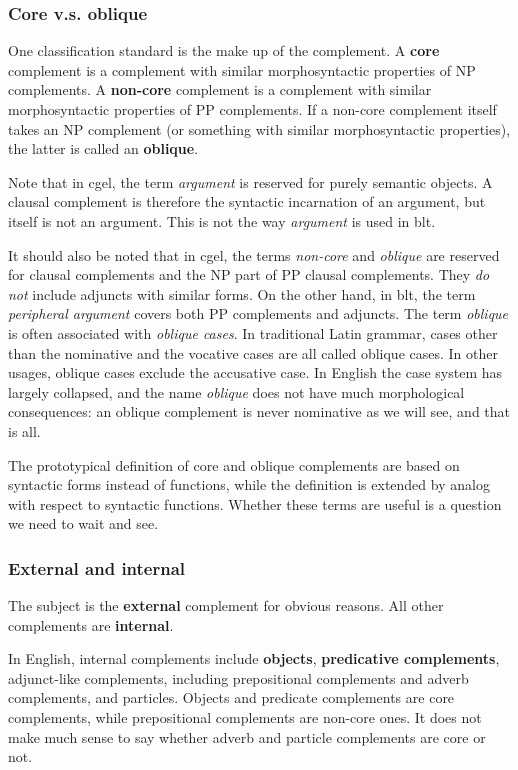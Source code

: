 \documentclass{article}
\newcommand*{\concept}[1]{\textbf{#1}}
\newcommand*{\term}[1]{\emph{#1}}
\begin{document}
\subsubsection{Core v.s. oblique}\label{sec:core-oblique}

One classification standard is the make up of the complement.
A \concept{core} complement is a complement with similar morphosyntactic properties of NP complements.
A \concept{non-core} complement is a complement with similar morphosyntactic properties of PP complements.
If a non-core complement itself takes an NP complement (or something with similar morphosyntactic properties),
the latter is called an \concept{oblique}.

Note that in \ac{cgel}, the term \term{argument} is reserved for purely semantic objects.
A clausal complement is therefore the syntactic incarnation of an argument,
but itself is not an argument.
This is not the way \term{argument} is used in \ac{blt}.

It should also be noted that in \ac{cgel}, the terms \term{non-core} and \term{oblique} 
are reserved for clausal complements and the NP part of PP clausal complements.
They \emph{do not} include adjuncts with similar forms.
On the other hand, in \ac{blt}, the term \term{peripheral argument} covers both PP complements and adjuncts.
The term \term{oblique} is often associated with \term{oblique cases}.
In traditional Latin grammar, 
cases other than the nominative and the vocative cases are all called oblique cases.
In other usages, oblique cases exclude the accusative case.
In English the case system has largely collapsed,
and the name \term{oblique} does not have much morphological consequences:
an oblique complement is never nominative as we will see, and that is all.

The prototypical definition of core and oblique complements 
are based on syntactic forms instead of functions,
while the definition is extended by analog with respect to syntactic functions.
Whether these terms are useful is a question we need to wait and see.

\subsubsection{External and internal}\label{sec:external-and-internal}

The subject is the \concept{external} complement for obvious reasons.
All other complements are \concept{internal}.

In English, internal complements include \concept{objects}, \concept{predicative complements},
adjunct-like complements, including prepositional complements and adverb complements,
and particles.
Objects and predicate complements are core complements,
while prepositional complements are non-core ones.
It does not make much sense to say whether adverb and particle complements are core or not.
\end{document}
